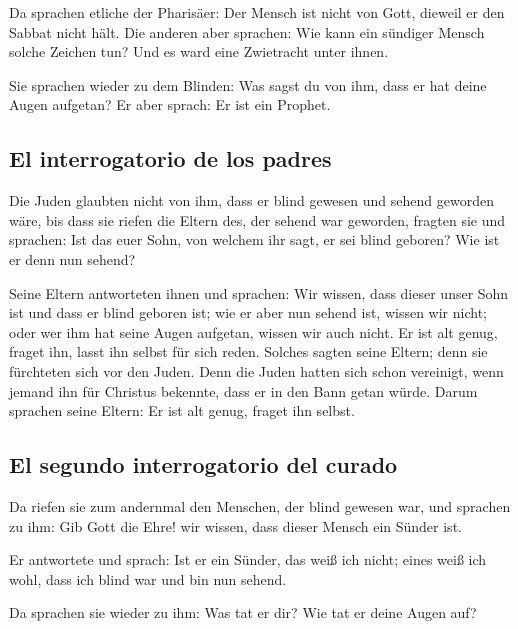  Da sprachen etliche der Pharisäer: Der Mensch ist nicht
von Gott, dieweil er den Sabbat nicht hält. Die anderen aber sprachen:
Wie kann ein sündiger Mensch solche Zeichen tun? Und es ward eine
Zwietracht unter ihnen.

 Sie sprachen wieder zu dem Blinden: Was sagst du von
ihm, dass er hat deine Augen aufgetan? Er aber sprach: Er ist ein
Prophet.

\hypertarget{el-interrogatorio-de-los-padres}{%
\subsection{El interrogatorio de los
padres}\label{el-interrogatorio-de-los-padres}}

 Die Juden glaubten nicht von ihm, dass er blind gewesen
und sehend geworden wäre, bis dass sie riefen die Eltern des, der sehend
war geworden,  fragten sie und sprachen: Ist das euer
Sohn, von welchem ihr sagt, er sei blind geboren? Wie ist er denn nun
sehend?

 Seine Eltern antworteten ihnen und sprachen: Wir wissen,
dass dieser unser Sohn ist und dass er blind geboren ist;
 wie er aber nun sehend ist, wissen wir nicht; oder wer
ihm hat seine Augen aufgetan, wissen wir auch nicht. Er ist alt genug,
fraget ihn, lasst ihn selbst für sich reden.  Solches
sagten seine Eltern; denn sie fürchteten sich vor den Juden. Denn die
Juden hatten sich schon vereinigt, wenn jemand ihn für Christus
bekennte, dass er in den Bann getan würde.  Darum
sprachen seine Eltern: Er ist alt genug, fraget ihn selbst.

\hypertarget{el-segundo-interrogatorio-del-curado}{%
\subsection{El segundo interrogatorio del
curado}\label{el-segundo-interrogatorio-del-curado}}

 Da riefen sie zum andernmal den Menschen, der blind
gewesen war, und sprachen zu ihm: Gib Gott die Ehre! wir wissen, dass
dieser Mensch ein Sünder ist.

 Er antwortete und sprach: Ist er ein Sünder, das weiß
ich nicht; eines weiß ich wohl, dass ich blind war und bin nun sehend.

 Da sprachen sie wieder zu ihm: Was tat er dir? Wie tat
er deine Augen auf?


